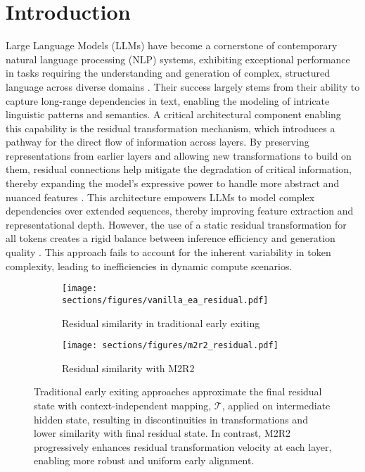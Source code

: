 \section{Introduction}
\label{sec:intro}
Large Language Models (LLMs) have become a cornerstone of contemporary natural language processing (NLP) systems, exhibiting exceptional performance in tasks requiring the understanding and generation of complex, structured language across diverse domains \cite{brown2020language, radford2019language, vaswani2017attention}. Their success largely stems from their ability to capture long-range dependencies in text, enabling the modeling of intricate linguistic patterns and semantics. A critical architectural component enabling this capability is the residual transformation mechanism, which introduces a pathway for the direct flow of information across layers. By preserving representations from earlier layers and allowing new transformations to build on them, residual connections help mitigate the degradation of critical information, thereby expanding the model’s expressive power to handle more abstract and nuanced features \cite{he2016identity, ba2016layer, vaswani2017attention}. This architecture empowers LLMs to model complex dependencies over extended sequences, thereby improving feature extraction and representational depth. However, the use of a static residual transformation for all tokens creates a rigid balance between inference efficiency and generation quality \cite{shen2021dynamic, garncarek2021dynamic}. This approach fails to account for the inherent variability in token complexity, leading to inefficiencies in dynamic compute scenarios.


\begin{figure}[ht]
    \centering
    \begin{subfigure}{0.49\textwidth}
        \centering
        \texttt{[image: sections/figures/vanilla\_ea\_residual.pdf]}
        \caption{Residual similarity in traditional early exiting}
        \label{fig:vanilla_ea_residual_sim}
    \end{subfigure}%
    \hfill
    \begin{subfigure}{0.49\textwidth}
        \centering
        \texttt{[image: sections/figures/m2r2\_residual.pdf]}
        \caption{Residual similarity with M2R2}
        \label{fig:m2r2_residual_sim}
    \end{subfigure}
    \caption{Traditional early exiting approaches approximate the final residual state with context-independent mapping, $\mathcal{T}$, applied on intermediate hidden state, resulting in discontinuities in transformations and lower similarity with final residual state. In contrast, M2R2 progressively enhances residual transformation velocity at each layer, enabling more robust and uniform early alignment.}
    \label{fig:residual_sim}
\end{figure}


